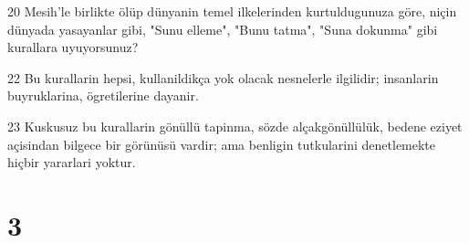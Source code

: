 \par 20 Mesih'le birlikte ölüp dünyanin temel ilkelerinden kurtuldugunuza göre, niçin dünyada yasayanlar gibi, "Sunu elleme", "Bunu tatma", "Suna dokunma" gibi kurallara uyuyorsunuz?
\par 22 Bu kurallarin hepsi, kullanildikça yok olacak nesnelerle ilgilidir; insanlarin buyruklarina, ögretilerine dayanir.
\par 23 Kuskusuz bu kurallarin gönüllü tapinma, sözde alçakgönüllülük, bedene eziyet açisindan bilgece bir görünüsü vardir; ama benligin tutkularini denetlemekte hiçbir yararlari yoktur.

\chapter{3}

